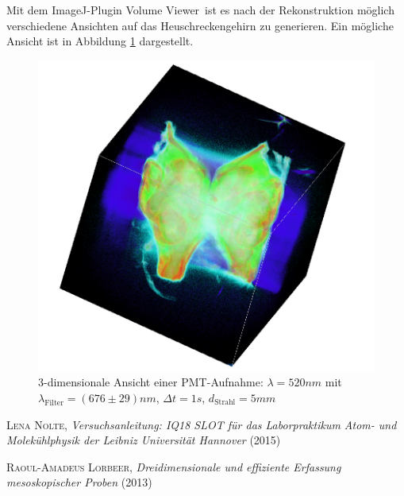 \begin{minipage}{\linewidth}
Mit dem ImageJ-Plugin \glqq Volume Viewer\grqq \, ist es nach der Rekonstruktion möglich verschiedene Ansichten auf das Heuschreckengehirn zu generieren. Ein mögliche Ansicht ist in Abbildung \ref{fig:3d} dargestellt.

\begin{figure}[H]
\centering
\includegraphics[width=\linewidth]{IMAGE/3dtomo.png}
\caption{3-dimensionale Ansicht einer PMT-Aufnahme: $\lambda = 520 \si{nm}$ mit\\ $\lambda_\text{Filter} = (676 \pm 29) \si{nm}$, $\Delta{t} = 1 \si{s}$, $d_\text{Strahl} = 5 \si{mm}$}
	\label{fig:3d}
\end{figure}
\end{minipage}

\clearpage
\listoffigures
\begin{thebibliography}{99}
 \textsc{Lena Nolte}, \emph{Versuchsanleitung: IQ18 SLOT für das Laborpraktikum Atom- und Molekühlphysik
der Leibniz Universität Hannover} (2015) 

 \textsc{Raoul-Amadeus Lorbeer}, \emph{Dreidimensionale und effiziente Erfassung mesoskopischer Proben} (2013) 
\end{thebibliography}




